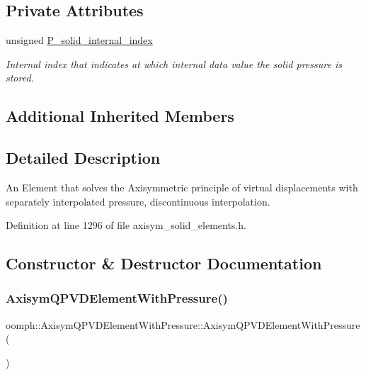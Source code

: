\subsection*{Private Attributes}
\begin{DoxyCompactItemize}
\item 
unsigned \hyperlink{classoomph_1_1AxisymQPVDElementWithPressure_a105317d009a9edf0ed149f4cc565689b}{P\+\_\+solid\+\_\+internal\+\_\+index}
\begin{DoxyCompactList}\small\item\em Internal index that indicates at which internal data value the solid pressure is stored. \end{DoxyCompactList}\end{DoxyCompactItemize}
\subsection*{Additional Inherited Members}


\subsection{Detailed Description}
An Element that solves the Axisymmetric principle of virtual displacements with separately interpolated pressure, discontinuous interpolation. 

Definition at line 1296 of file axisym\+\_\+solid\+\_\+elements.\+h.



\subsection{Constructor \& Destructor Documentation}
\mbox{\label{classoomph_1_1AxisymQPVDElementWithPressure_a5b902a463ba218dd83d9641510a6fbfb}} 
\subsubsection{\texorpdfstring{Axisym\+Q\+P\+V\+D\+Element\+With\+Pressure()}{AxisymQPVDElementWithPressure()}}
{\footnotesize\ttfamily oomph\+::\+Axisym\+Q\+P\+V\+D\+Element\+With\+Pressure\+::\+Axisym\+Q\+P\+V\+D\+Element\+With\+Pressure (\begin{DoxyParamCaption}{ }\end{DoxyParamCaption})\hspace{0.3cm}{\ttfamily [inline]}}



